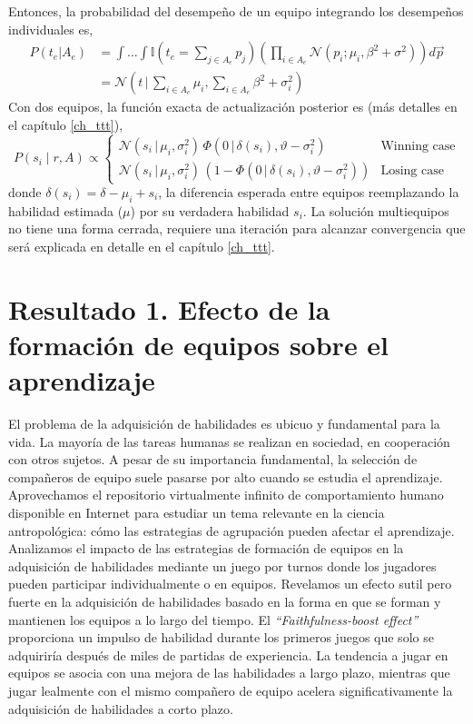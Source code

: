 \documentclass[a4paper,11pt]{book}
\newcommand{\N}{\mathcal{N}}
\theoremstyle{definition}
\begin{document}
Entonces, la probabilidad del desempe\~no de un equipo integrando los desempe\~nos individuales es,
\begin{align}
 P(t_e|A_e) &= \int \dots \int \mathbb{I}(t_e = \sum_{j\in A_e } p_j ) \left(\prod_{i \in A_e} \N(p_i;\mu_i,\beta^2 + \sigma^2) \right) d\vec{p} \\
 & = \N\left(t\,|\,\sum_{i\in A_e} \mu_i,\sum_{i\in A_e} \beta^2 + \sigma_i^2\right)
\end{align}
%
Con dos equipos, la funci\'on exacta de actualizaci\'on posterior es (m\'as detalles en el cap\'itulo \ref{ch_ttt}),
%
\begin{equation}
 P(s_i \mid r, A) \propto
 \begin{cases}
  \N(s_i \, | \, \mu_i, \sigma_i^2) \, \Phi(0 \, | \, \delta(s_i), \vartheta - \sigma_i^2) & \text{Winning case} \\
  \N(s_i \, | \, \mu_i, \sigma_i^2 ) \, (1 - \Phi(0 \, | \, \delta(s_i), \vartheta - \sigma_i^2)) & \text{Losing case}
 \end{cases}
\end{equation}
%
donde $\delta(s_i) = \delta - \mu_i + s_i$, la diferencia esperada entre equipos reemplazando la habilidad estimada ($\mu$) por su verdadera habilidad $s_i$.
%
La soluci\'on multiequipos no tiene una forma cerrada, requiere una iteraci\'on para alcanzar convergencia que ser\'a explicada en detalle en el cap\'itulo \ref{ch_ttt}.












\chapter{Resultado 1. Efecto de la formaci\'on de equipos sobre el aprendizaje}\label{ch_team}

El problema de la adquisici\'on de habilidades es ubicuo y fundamental para la vida.
%
La mayor\'ia de las tareas humanas se realizan en sociedad, en cooperaci\'on con otros sujetos.
%
A pesar de su importancia fundamental, la selecci\'on de compa\~neros de equipo suele pasarse por alto cuando se estudia el aprendizaje.
%
Aprovechamos el repositorio virtualmente infinito de comportamiento humano disponible en Internet para estudiar un tema relevante en la ciencia antropol\'ogica: c\'omo las estrategias de agrupaci\'on pueden afectar el aprendizaje.
%
Analizamos el impacto de las estrategias de formaci\'on de equipos en la adquisici\'on de habilidades mediante un juego por turnos donde los jugadores pueden participar individualmente o en equipos.
%
Revelamos un efecto sutil pero fuerte en la adquisici\'on de habilidades basado en la forma en que se forman y mantienen los equipos a lo largo del tiempo.
%
El \emph{``Faithfulness-boost effect''} proporciona un impulso de habilidad durante los primeros juegos que solo se adquirir\'ia despu\'es de miles de partidas de experiencia.
%
La tendencia a jugar en equipos se asocia con una mejora de las habilidades a largo plazo, mientras que jugar lealmente con el mismo compa\~nero de equipo acelera significativamente la adquisici\'on de habilidades a corto plazo.
\end{document}
